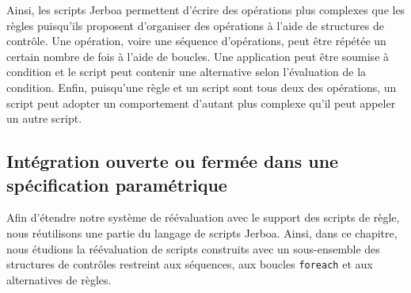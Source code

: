 Ainsi, les scripts Jerboa permettent d'écrire des opérations plus complexes que
les règles puisqu'ils proposent d'organiser des opérations à l'aide de
structures de contrôle. %
Une opération, voire une séquence d'opérations, peut être répétée un certain
nombre de fois à l'aide de boucles. %
Une application peut être soumise à condition et le script peut contenir une
alternative selon l'évaluation de la condition. %
Enfin, puisqu'une règle et un script sont tous deux des opérations, un script
peut adopter un comportement d'autant plus complexe qu'il peut appeler un autre
script. %



\subsection{Intégration ouverte ou fermée dans une spécification paramétrique}
\label{sec:extension-scripts-scripts-scripts-reevaluation}



Afin d'étendre notre système de réévaluation avec le support des scripts de
règle, nous réutilisons une partie du langage de scripts Jerboa. %
Ainsi, dans ce chapitre, nous étudions la réévaluation de scripts construits
avec un sous-ensemble des structures de contrôles restreint aux séquences, aux
boucles \texttt{foreach} et aux alternatives de règles. %

